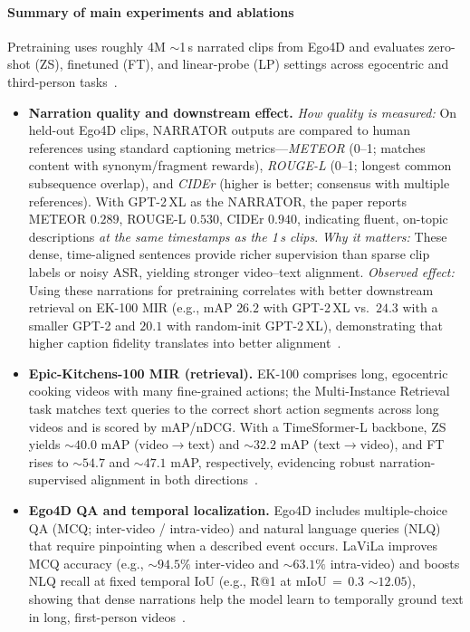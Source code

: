\begin{enrichment}
\begin{enrichment}
        \paragraph{Summary of main experiments and ablations}
        Pretraining uses roughly 4M $\sim$1\,s narrated clips from Ego4D and evaluates zero-shot (ZS), finetuned (FT), and linear-probe (LP) settings across egocentric and third-person tasks~\cite{zhao2022_lavila}.
        \begin{itemize}
            \item \textbf{Narration quality and downstream effect.} \emph{How quality is measured:} On held-out Ego4D clips, NARRATOR outputs are compared to human references using standard captioning metrics—\emph{METEOR} (0–1; matches content with synonym/fragment rewards), \emph{ROUGE\mbox{-}L} (0–1; longest common subsequence overlap), and \emph{CIDEr} (higher is better; consensus with multiple references). With GPT\mbox{-}2\,XL as the NARRATOR, the paper reports METEOR $0.289$, ROUGE\mbox{-}L $0.530$, CIDEr $0.940$, indicating fluent, on\mbox{-}topic descriptions \emph{at the same timestamps as the 1\,s clips}. \emph{Why it matters:} These dense, time\mbox{-}aligned sentences provide richer supervision than sparse clip labels or noisy ASR, yielding stronger video–text alignment. \emph{Observed effect:} Using these narrations for pretraining correlates with better downstream retrieval on EK\mbox{-}100 MIR (e.g., mAP $26.2$ with GPT\mbox{-}2\,XL vs.\ $24.3$ with a smaller GPT\mbox{-}2 and $20.1$ with random\mbox{-}init GPT\mbox{-}2\,XL), demonstrating that higher caption fidelity translates into better alignment~\cite{zhao2022_lavila}.
            \item \textbf{Epic\mbox{-}Kitchens\mbox{-}100 MIR (retrieval).} EK\mbox{-}100 comprises long, egocentric cooking videos with many fine\mbox{-}grained actions; the Multi\mbox{-}Instance Retrieval task matches text queries to the correct short action segments across long videos and is scored by mAP/nDCG. With a TimeSformer\mbox{-}L backbone, ZS yields $\sim 40.0$ mAP (video$\rightarrow$text) and $\sim 32.2$ mAP (text$\rightarrow$video), and FT rises to $\sim 54.7$ and $\sim 47.1$ mAP, respectively, evidencing robust narration\mbox{-}supervised alignment in both directions~\cite{zhao2022_lavila}.
            \item \textbf{Ego4D QA and temporal localization.} Ego4D includes multiple\mbox{-}choice QA (MCQ; inter\mbox{-}video / intra\mbox{-}video) and natural language queries (NLQ) that require pinpointing when a described event occurs. LaViLa improves MCQ accuracy (e.g., $\sim 94.5\%$ inter\mbox{-}video and $\sim 63.1\%$ intra\mbox{-}video) and boosts NLQ recall at fixed temporal IoU (e.g., R@1 at mIoU$\,{=}\,0.3$ $\sim 12.05$), showing that dense narrations help the model learn to temporally ground text in long, first\mbox{-}person videos~\cite{zhao2022_lavila}.

\end{itemize}
\end{enrichment}
\end{enrichment}

